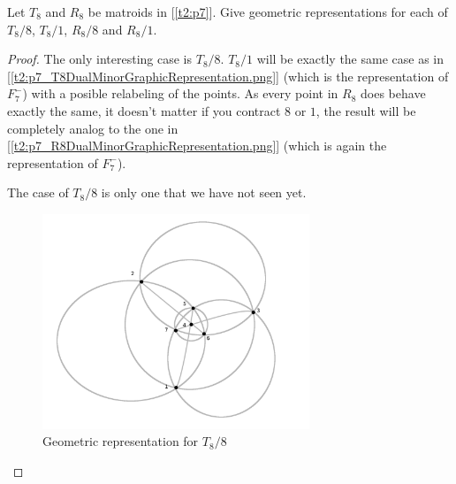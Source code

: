 \prob
{
    Let $T_8$ and $R_8$ be matroids in [\ref{t2:p7}]. Give geometric
		representations for each of $T_8 / 8$, $T_8 / 1$, $R_8 / 8$ and $R_8 / 1$.
}
\begin{proof}
    The only interesting case is $T_8 / 8$. $T_8 / 1$ will be exactly the same case as in [\ref{t2:p7_T8DualMinorGraphicRepresentation.png}] 
    (which is the representation of $F_7^-$) with a posible relabeling of the points. As every point in $R_8$ does behave exactly the same, 
    it doesn't matter if you contract $8$ or $1$, the result will be completely analog to the one in 
    [\ref{t2:p7_R8DualMinorGraphicRepresentation.png}] (which is again the representation of $F_7^-$).
    
    The case of $T_8 / 8$ is only one that we have not seen yet. 
    
    \begin{figure}[H]
        \begin{center}
            \includegraphics[width=8cm]{Test2/Problem17/T8_contracting_8.png}
        \end{center}                            
        \caption{Geometric representation for $T_8 / 8$}
        \label{t2:p17_T8_contracting_8.png}                        
    \end{figure}\pn  
\end{proof}
